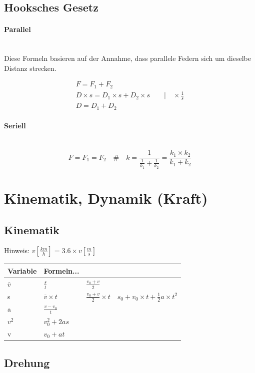 \documentclass[a4paper,10pt]{article}
\newcommand{\lbparagraph}[1]{\paragraph{#1}\mbox{}\\}
\newcommand{\eqsp}[1]{\quad\#\quad}
\begin{document}
\subsection{Hooksches Gesetz}

\lbparagraph{Parallel}

Diese Formeln basieren auf der Annahme, dass parallele Federn sich um dieselbe Distanz strecken.

\begin{gather}
    F = F_1 + F_2
    \\
    D \times s = D_1 \times s + D_2 \times s \qquad | \quad \times\frac{1}{s}
    \\
    D = D_1 + D_2
\end{gather}

\lbparagraph{Seriell}

\begin{equation}
    F = F_1 = F_2
    \eqsp{}
    k = \frac{1}{\frac{1}{k_1} + \frac{1}{k_2}} = \frac{k_1 \times k_2}{k_1 + k_2}
\end{equation}
    
\section{Kinematik, Dynamik (Kraft)}

\subsection{Kinematik}

Hinweis: $v[\frac{km}{h}] = 3.6 \times v[\frac{m}{s}]$ \newline

\begin{tabular}{l|l|l|l}
    Variable & Formeln... & & \\
    \hline
    $\overline{v}$ & $\frac{s}{t}$ & $\frac{v_0 + v}{2}$ & \\
    \hline
    s & $\overline{v} \times t$ & $\frac{v_0 + v}{2} \times t$ & $s_0 + v_0 \times t + \frac{1}{2}a \times t^2$ \\
    \hline
    a & $\frac{v - v_0}{t}$ & & \\
    \hline
    $v^2$ & $v_0^2 + 2as$ & & \\
    \hline
    v & $v_0 + at$ & &
\end{tabular}

\subsection{Drehung}
\end{document}
